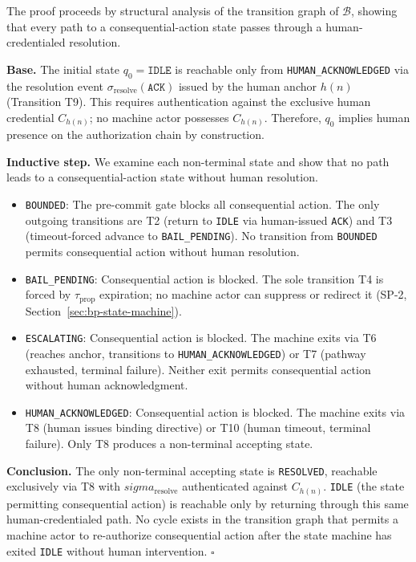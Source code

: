 \begin{Proof}
The proof proceeds by structural analysis of the transition graph of
$\mathcal{B}$, showing that every path to a consequential-action state passes
through a human-credentialed resolution.

\textbf{Base.}  The initial state $q_0 = \texttt{IDLE}$ is reachable only from
\texttt{HUMAN\_ACKNOWLEDGED} via the resolution event
$\sigma_{\text{resolve}}(\texttt{ACK})$ issued by the human anchor $h(n)$
(Transition T9).  This requires authentication against the exclusive human
credential $C_{h(n)}$; no machine actor possesses $C_{h(n)}$.  Therefore,
$q_0$ implies human presence on the authorization chain by construction.

\textbf{Inductive step.}  We examine each non-terminal state and show that no
path leads to a consequential-action state without human resolution.

\begin{itemize}\itemsep=0pt
\item \texttt{BOUNDED}: The pre-commit gate blocks all consequential action.  The
only outgoing transitions are T2 (return to \texttt{IDLE} via human-issued
\texttt{ACK}) and T3 (timeout-forced advance to \texttt{BAIL\_PENDING}).  No
transition from \texttt{BOUNDED} permits consequential action without human
resolution.

\item \texttt{BAIL\_PENDING}: Consequential action is blocked.  The sole
transition T4 is forced by $\tau_{\text{prop}}$ expiration; no machine actor can
suppress or redirect it (SP-2, Section~\ref{sec:bp-state-machine}).

\item \texttt{ESCALATING}: Consequential action is blocked.  The machine exits
via T6 (reaches anchor, transitions to \texttt{HUMAN\_ACKNOWLEDGED}) or T7
(pathway exhausted, terminal failure).  Neither exit permits consequential
action without human acknowledgment.

\item \texttt{HUMAN\_ACKNOWLEDGED}: Consequential action is blocked.  The
machine exits via T8 (human issues binding directive) or T10 (human timeout,
terminal failure).  Only T8 produces a non-terminal accepting state.
\end{itemize}

\textbf{Conclusion.}  The only non-terminal accepting state is \texttt{RESOLVED},
reachable exclusively via T8 with $sigma_{\text{resolve}}$ authenticated against
$C_{h(n)}$.  \texttt{IDLE} (the state permitting consequential action) is
reachable only by returning through this same human-credentialed path.  No cycle
exists in the transition graph that permits a machine actor to re-authorize
consequential action after the state machine has exited \texttt{IDLE} without
human intervention.  $\square$
\end{Proof}

